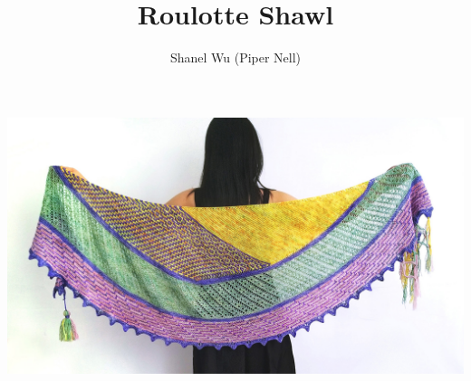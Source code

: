 \documentclass[12pt]{article}
\title{Roulotte Shawl} %
\author{Shanel Wu (Piper Nell)}
\begin{document}

\begin{center}
\includegraphics[width=\linewidth]{backspread-small.jpg}
\end{center}


{\selectfont
\HUGE\textbf{\thetitle}
\hspace{3.5em} %
\normalsize\theauthor
}
\end{document}
